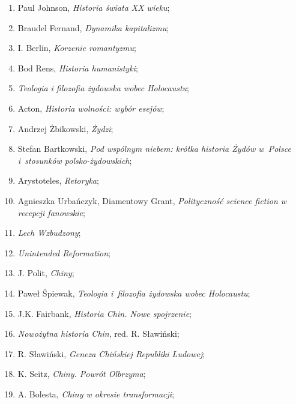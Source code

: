 \documentclass[a4paper,11pt]{article}
\begin{document}
\begin{enumerate}
\item Paul Johnson, \emph{Historia świata XX wieku};

\item Braudel Fernand, \emph{Dynamika kapitalizmu};

\item I. Berlin, \emph{Korzenie romantyzmu};

\item Bod Rens, \emph{Historia humanistyki};

\item \emph{Teologia i filozofia żydowska wobec Holocaustu};

\item Acton, \emph{Historia wolności: wybór esejów};

\item Andrzej Żbikowski, \emph{Żydzi};

\item Stefan Bartkowski, \emph{Pod wspólnym niebem: krótka historia
    Żydów w~Polsce i~stosunków polsko-żydowskich};

\item Arystoteles, \emph{Retoryka};

\item Agnieszka Urbańczyk, Diamentowy Grant, \emph{Polityczność
    science fiction w recepcji fanowskie};

\item \emph{Lech Wzbudzony};

\item \emph{Unintended Reformation};

\item J. Polit, \emph{Chiny};

\item Paweł Śpiewak, \emph{Teologia i~filozofia żydowska wobec
    Holocaustu};

\item J.K. Fairbank, \emph{Historia Chin. Nowe spojrzenie};

\item \emph{Nowożytna historia Chin}, red. R. Sławiński;

\item R. Sławiński, \emph{Geneza Chińskiej Republiki Ludowej};

\item K. Seitz, \emph{Chiny. Powrót Olbrzyma};

\item A. Bolesta, \emph{Chiny w okresie transformacji};


\end{enumerate}
\end{document}
